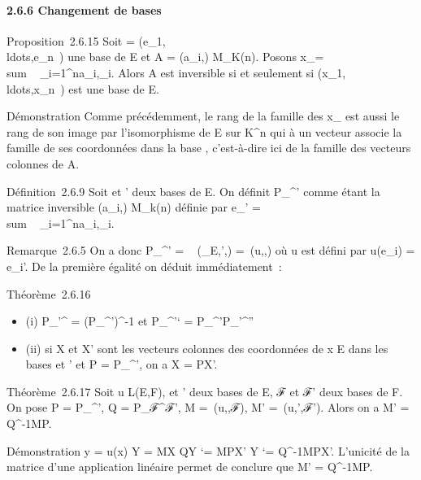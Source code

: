 \documentclass[]{article}
\begin{document}
\paragraph{2.6.6 Changement de bases}

Proposition~2.6.15 Soit  =
(e\_1,\\ldots,e\_n~)
une base de E et A = (a\_i,\jmath) \in M\_K(n). Posons
x\_\jmath = \\sum ~
\_i=1^na\_i,\jmathe\_i. Alors A est inversible
si et seulement si
(x\_1,\\ldots,x\_n~)
est une base de E.

Démonstration Comme précédemment, le rang de la famille des x\_\jmath
est aussi le rang de son image par l'isomorphisme de E sur
K^n qui à un vecteur associe la famille de ses coordonnées
dans la base , c'est-à-dire ici de la famille des vecteurs colonnes de
A.

Définition~2.6.9 Soit  et ' deux bases de E. On définit
P\_^' comme étant la matrice inversible
(a\_i,\jmath) \in M\_k(n) définie par e\_\jmath'
= \\sum ~
\_i=1^na\_i,\jmathe\_i.

Remarque~2.6.5 On a donc P\_^'
= \mathrmMat~
(\mathrmId\_E,',) =\
\mathrmMat (u,,) où u est défini par
u(e\_i) = e\_i'. De la première égalité on déduit
immédiatement~:

Théorème~2.6.16

\begin{itemize}
\itemsep1pt\parskip0pt
\item
  (i) P\_'^ = (P\_^')^-1 et
  P\_^'` =
  P\_^'P\_\mathcal{E}'^''
\item
  (ii) si X et X' sont les vecteurs colonnes des coordonnées de x \in E
  dans les bases  et ' et P = P\_\mathcal{E}^\mathcal{E}', on a X = PX'.
\end{itemize}

Théorème~2.6.17 Soit u \in L(E,F),  et ' deux bases de E, ℱ et ℱ' deux
bases de F. On pose P = P\_^\mathcal{E}', Q =
P\_ℱ^ℱ', M =\
\mathrmMat (u,\mathcal{E},ℱ), M' =\
\mathrmMat (u,',ℱ'). Alors on a M' =
Q^-1MP.

Démonstration y = u(x) \Leftrightarrow Y = MX
\Leftrightarrow QY `= MPX' \mathrel\Leftrightarrow Y
`= Q^-1MPX'. L'unicité de la matrice d'une application
linéaire permet de conclure que M' = Q^-1MP.
\end{document}
